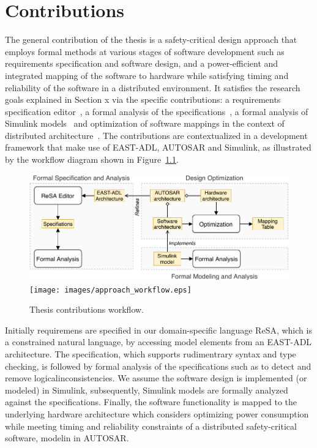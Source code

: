 \chapter{Contributions}
	The general contribution of the thesis is a safety-critical design approach that employs formal methods at various stages of software development such as requirements specification and software design, and a power-efficient and integrated mapping of the software to hardware while satisfying timing and reliability of the software in a distributed environment. It satisfies the research goals explained in Section x via the specific contributions: a requirements specification editor~\cite{Mahmud2015ReSA:Systems}\cite{resatool}, a formal analysis of the specifications~\cite{resatool}\cite{Mahmud2017SpecificationLogic}, a formal analysis of Simulink models~\cite{Filipovikj2018SimppaalModels} and optimization of software mappings in the context of distributed architecture~\cite{Mahmud5222}\cite{Mahmud2019Power-awareOptimization}. The contributions are contextualized in a development framework that make use of EAST-ADL, AUTOSAR and Simulink, as illustrated by the workflow diagram shown in Figure~\ref{fig_workflow}.
\begin{figure}[h]
	\centering
	\ifpdf
	\includegraphics[width=\linewidth]{images/approach_workflow}
	\else
	\texttt{[image: images/approach\_workflow.eps]}
	\fi
	\caption{Thesis contributions workflow.} 
	\label{fig_workflow}
\end{figure}

Initially requiremens are specified in our domain-specific language ReSA, which is a constrained natural language, by accessing model elements from an EAST-ADL architecture. The specification, which supports rudimentrary syntax and type checking, is followed by formal analysis of the specifications such as to detect and remove logicalinconsistencies. We assume the software design is implemented (or modeled) in Simulink, subsequently, Simulink models are formally analyzed against the specifications. Finally, the software functionality is mapped to the underlying hardware architecture which considers optimizing power consumption while meeting timing and reliability constraints of a distributed safety-critical software, modelin in AUTOSAR.

